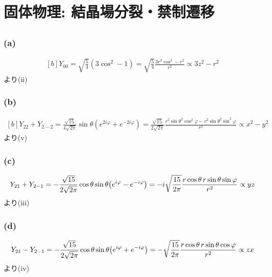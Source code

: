 \documentclass[../ap_2011.tex]{subfiles}
\begin{document}
\setcounter{chapter}{3}
\chapter{固体物理: 結晶場分裂・禁制遷移}
\section{}
\subsection*{(a)}
\begin{equation}\begin{aligned}[b]
    Y_{00} = \sqrt{\frac{5}{4}}(3\cos^2-1)
    =\sqrt{\frac{5}{4}}\frac{3r^2\cos^2-r^2}{r^2}\propto 3z^2-r^2
\end{aligned}\end{equation}
より(ii)

\subsection*{(b)}
\begin{equation}\begin{aligned}[b]
    Y_{22}+Y_{2-2} = \frac{\sqrt{15}}{4\sqrt{2\pi}}\sin\theta(e^{2i\varphi}+e^{-2i\varphi})
    =\frac{\sqrt{15}}{2\sqrt{2\pi}}\frac{r^2\sin\theta^2\cos^2\varphi-r^2\sin\theta^2\sin^2\varphi}{r^2}\propto x^2-y^2
\end{aligned}\end{equation}
より(v)

\subsection*{(c)}
\begin{equation}\begin{aligned}[b]
    Y_{21}+Y_{2-1}=-\frac{\sqrt{15}}{2\sqrt{2\pi}}\cos\theta\sin\theta\qty(e^{i\varphi}-e^{-i\varphi})
    =-i\sqrt{\frac{15}{2\pi}}\frac{r\cos\theta \,r\sin\theta\sin\varphi}{r^2} \propto yz
\end{aligned}\end{equation}
より(iii)

\subsection*{(d)}
\begin{equation}\begin{aligned}[b]
    Y_{21}-Y_{2-1}=-\frac{\sqrt{15}}{2\sqrt{2\pi}}\cos\theta\sin\theta\qty(e^{i\varphi}+e^{-i\varphi})
    =-\sqrt{\frac{15}{2\pi}}\frac{r\cos\theta \,r\sin\theta\cos\varphi}{r^2} \propto zx
\end{aligned}\end{equation}
より(iv)
\end{document}
